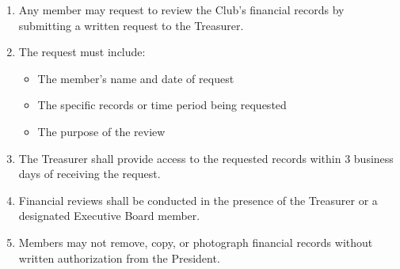 \begin{enumerate}[label=\alph*), leftmargin=2em, itemsep=0.3em]
    \item Any member may request to review the Club's financial records by submitting a written request to the Treasurer.
    \item The request must include:
    \begin{itemize}[leftmargin=1.5em, itemsep=0.2em]
        \item The member's name and date of request
        \item The specific records or time period being requested
        \item The purpose of the review
    \end{itemize}
    \item The Treasurer shall provide access to the requested records within 3 business days of receiving the request.
    \item Financial reviews shall be conducted in the presence of the Treasurer or a designated Executive Board member.
    \item Members may not remove, copy, or photograph financial records without written authorization from the President.
\end{enumerate}
